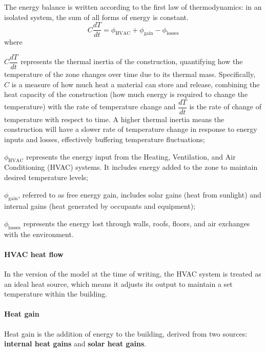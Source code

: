 \documentclass[runningheads]{llncs}
\begin{document}
The energy balance is written according to the first law of thermodynamics: in an isolated system, the sum of all forms of energy is constant.
\begin{equation}
    C \frac{dT}{dt} = \phi_{\mathrm{HVAC}} + \phi_{\mathrm{gain}} - \phi_{\mathrm{losses}}
\end{equation}
where
\begin{inparaenum}[\it (i)]
    \item $C \dfrac{dT}{dt}$ represents the thermal inertia of the construction, quantifying how the temperature of the zone changes over time due to its thermal mass. Specifically,
    $C$ is a measure of how much heat a material can store and release, combining the heat capacity of the construction (how much energy is required to change the temperature) with the rate of temperature change and 
    $\dfrac{dT}{dt}$ is the rate of change of temperature with respect to time. A higher thermal inertia means the construction will have a slower rate of temperature change in response to energy inputs and losses, effectively buffering temperature fluctuations;
    \item $\phi_{\mathrm{HVAC}}$ represents the energy input from the Heating, Ventilation, and Air Conditioning (HVAC) systems. It includes energy added to the zone to maintain desired temperature levels;
    \item $\phi_{\mathrm{gain}}$, referred to as free energy gain, includes solar gains (heat from sunlight) and internal gains (heat generated by occupants and equipment);
    \item $\phi_{\mathrm{losses}}$ represents the energy lost through walls, roofs, floors, and air exchanges with the environment.
\end{inparaenum}

\paragraph{HVAC heat flow} In the version of the model at the time of writing, the HVAC system is treated as an ideal heat source, which means it adjusts its output to maintain a set temperature within the building.

\paragraph{Heat gain} Heat gain is the addition of energy to the building, derived from two sources: \textbf{internal heat gains} and \textbf{solar heat gains}.
\end{document}
